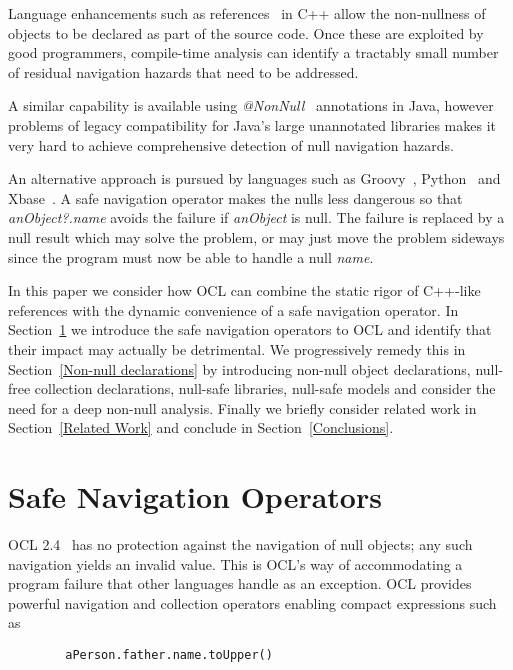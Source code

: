 \documentclass{llncs}
\begin{document}
Language enhancements such as references~\cite{c++-references} in C++ allow the non-nullness of objects to be declared as part of the source code. Once these are exploited by good programmers, compile-time analysis can identify a tractably small number of residual navigation hazards that need to be addressed.

A similar capability is available using \emph{@NonNull}~\cite{java-NonNull} annotations in Java, however problems of legacy compatibility for Java's large unannotated libraries makes it very hard to achieve comprehensive detection of null navigation hazards.

An alternative approach is pursued by languages such as Groovy~\cite{groovy}, Python~\cite{python} and Xbase~\cite{xbase}. A safe navigation operator makes the nulls less dangerous so that \emph{anObject?.name} avoids the failure if \emph{anObject} is null. The failure is replaced by a null result which may solve the problem, or may just move the problem sideways since the program must now be able to handle a null \emph{name}.

In this paper we consider how OCL can combine the static rigor of C++-like references with the dynamic convenience of a safe navigation operator. In Section~\ref{Safe Navigation Operators} we introduce the safe navigation operators to OCL and identify that their impact may actually be detrimental. We progressively remedy this in Section~\ref{Non-null declarations} by introducing non-null object declarations, null-free collection declarations, null-safe libraries, null-safe models and consider the need for a deep non-null analysis. Finally we briefly consider related work in Section~\ref{Related Work} and conclude in Section~\ref{Conclusions}.

\section{Safe Navigation Operators}\label{Safe Navigation Operators}

OCL 2.4~\cite{OCL-2.4} has no protection against the navigation of null objects; any such navigation yields an invalid value. This is OCL's way of accommodating a program failure that other languages handle as an exception. OCL provides powerful navigation and collection operators enabling compact expressions such as

\begin{verbatim}
        aPerson.father.name.toUpper()
\end{verbatim}
\end{document}
